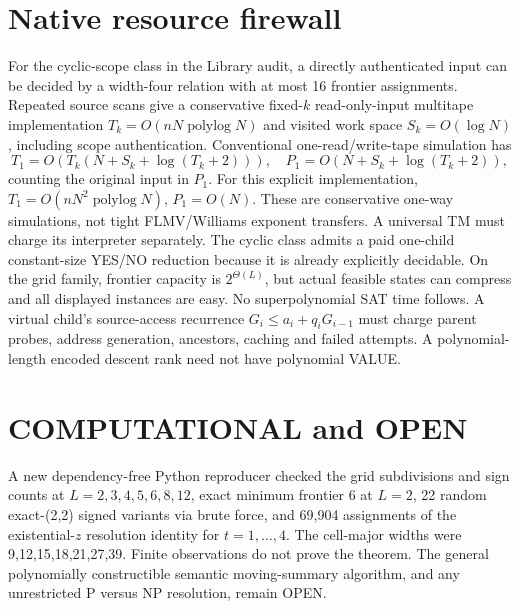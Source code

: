 \documentclass[11pt]{article}
\begin{document}
\section{Native resource firewall}
For the cyclic-scope class in the Library audit, a directly authenticated input can be decided by a width-four relation with at most 16 frontier assignments. Repeated source scans give a conservative fixed-$k$ read-only-input multitape implementation $T_k=O(nN\operatorname{polylog}N)$ and visited work space $S_k=O(\log N)$, including scope authentication. Conventional one-read/write-tape simulation has
\[
T_1=O(T_k(N+S_k+\log(T_k+2))),\quad P_1=O(N+S_k+\log(T_k+2)),
\]
counting the original input in $P_1$. For this explicit implementation, $T_1=O(nN^2\operatorname{polylog}N)$, $P_1=O(N)$. These are conservative one-way simulations, not tight FLMV/Williams exponent transfers. A universal TM must charge its interpreter separately.
The cyclic class admits a paid one-child constant-size YES/NO reduction because it is already explicitly decidable. On the grid family, frontier capacity is $2^{\Theta(L)}$, but actual feasible states can compress and all displayed instances are easy. No superpolynomial SAT time follows.
A virtual child's source-access recurrence $G_i\le a_i+q_iG_{i-1}$ must charge parent probes, address generation, ancestors, caching and failed attempts. A polynomial-length encoded descent rank need not have polynomial VALUE.
\section{COMPUTATIONAL and OPEN}
A new dependency-free Python reproducer checked the grid subdivisions and sign counts at $L=2,3,4,5,6,8,12$, exact minimum frontier 6 at $L=2$, 22 random exact-(2,2) signed variants via brute force, and 69,904 assignments of the existential-$z$ resolution identity for $t=1,\ldots,4$. The cell-major widths were 9,12,15,18,21,27,39. Finite observations do not prove the theorem. The general polynomially constructible semantic moving-summary algorithm, and any unrestricted P versus NP resolution, remain OPEN.
\end{document}
